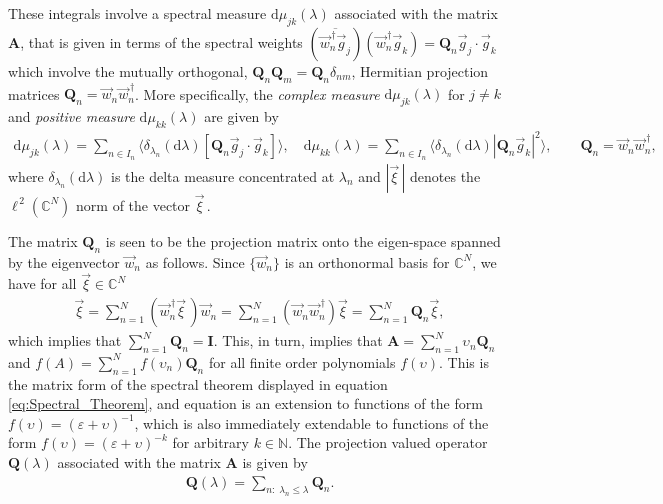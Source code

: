 \documentclass[11pt]{amsart}
\renewcommand{\d}{\mathrm{d}}
\newcommand{\Ib}{\mathbf{I}}
\newcommand{\Ab}{\mathbf{A}}
\newcommand{\Qb}{\mathbf{Q}}
\begin{document}
%
These integrals involve a spectral measure $\d\mu_{jk}(\lambda)$ associated
with the matrix $\Ab$, that is given in terms of the spectral weights 
$(\overline{\vec{w}_n^{\,\dagger}\vec{g}_j})(\vec{w}_n^{\,\dagger}\vec{g}_k)=\Qb_n\vec{g}_j\cdot\vec{g}_k$
which involve the mutually orthogonal, $\Qb_n\Qb_m=\Qb_n\delta_{nm}$,
Hermitian projection matrices $\Qb_n=\vec{w}_n\vec{w}_n^{\,\dagger}$.    
More specifically, the \emph{complex measure} $\d\mu_{jk}(\lambda)$ for $j\neq k$
and \emph{positive measure} $\d\mu_{kk}(\lambda)$ are given by 
% 
\begin{align}\label{eq:Discrete_Measures}
  \d\mu_{jk}(\lambda)=\sum_{n\in I_n}\langle\delta_{\lambda_n}(\d\lambda)[\Qb_n\vec{g}_j\cdot\vec{g}_k]\rangle, \quad  
  \d\mu_{kk}(\lambda)=\sum_{n\in I_n}\langle\delta_{\lambda_n}(\d\lambda)|\Qb_n\vec{g}_k|^2\rangle, \qquad
  \Qb_n=\vec{w}_n\vec{w}_n^{\,\dagger}, 
\end{align}
%
where $\delta_{\lambda_n}(\d\lambda)$ is the delta measure concentrated at $\lambda_n$ and
$|\vec{\xi}\,|$ denotes the $\ell^{\,2}(\mathbb{C}^N)$ norm of the vector
$\vec{\xi}\,$.





The matrix $\Qb_n$ is seen to be the projection matrix
onto the eigen-space spanned by the eigenvector $\vec{w}_n$ as
follows. Since $\{\vec{w}_n\}$ is an orthonormal basis for
$\mathbb{C}^N$, we have for all $\vec{\xi}\in\mathbb{C}^N$
%
\begin{align}\label{eq:Res_of_I}
  \vec{\xi}=\sum_{n=1}^N(\vec{w}_n^{\,\dagger}\vec{\xi}\,)\vec{w}_n
         =\sum_{n=1}^N(\vec{w}_n\vec{w}_n^{\,\dagger})\vec{\xi}
         =\sum_{n=1}^N\Qb_n\vec{\xi},
\end{align}
%
which implies that $\sum_{n=1}^N\Qb_n=\Ib$. This, in turn, implies that
$\Ab=\sum_{n=1}^N\upsilon_n\Qb_n$ and $f(A)=\sum_{n=1}^Nf(\upsilon_n)\Qb_n$ for all
finite order polynomials $f(\upsilon)$. This is the matrix form of the
spectral theorem displayed in equation \eqref{eq:Spectral_Theorem},
and equation is an extension to functions of the form
$f(\upsilon)=(\varepsilon+\upsilon)^{-1}$, which is also immediately extendable to functions
of the form $f(\upsilon)=(\varepsilon+\upsilon)^{-k}$ for arbitrary $k\in\mathbb{N}$. The
projection valued operator $\Qb(\lambda)$ associated with the matrix $\Ab$
is given by 
% 
\begin{align}
  \Qb(\lambda)=\sum_{n:\;\lambda_n\leq\lambda}\Qb_n.
\end{align}
%
\end{document}
